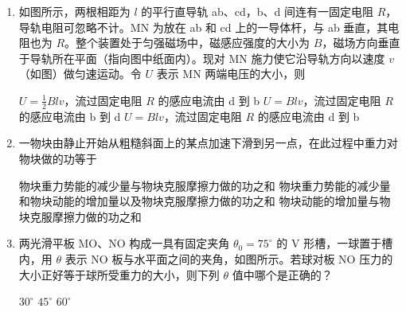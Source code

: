 \documentclass[\gkver]{gaokaozhenti}
\begin{document}
\begin{enumerate}

\item
如图所示，两根相距为 $l$ 的平行直导轨 ab、cd，b、d 间连有一固定电阻 $R$，导轨电阻可忽略不计。MN 为放在 ab 和 cd 上的一导体杆，与 ab 垂直，其电阻也为 $R$。整个装置处于匀强磁场中，磁感应强度的大小为 $B$，磁场方向垂直于导轨所在平面（指向图中纸面内）。现对 MN 施力使它沿导轨方向以速度 $v$（如图）做匀速运动。令 $U$ 表示 MN 两端电压的大小，则


{$U=\frac{1}{2}Blv$，流过固定电阻 $R$ 的感应电流由 d 到 b}
{$U=Blv$，流过固定电阻 $R$ 的感应电流由 b 到 d}
{$U=Blv$，流过固定电阻 $R$ 的感应电流由 d 到 b}


\item
一物块由静止开始从粗糙斜面上的某点加速下滑到另一点，在此过程中重力对物块做的功等于

{物块重力势能的减少量与物块克服摩擦力做的功之和}
{物块重力势能的减少量和物块动能的增加量以及物块克服摩擦力做的功之和}
{物块动能的增加量与物块克服摩擦力做的功之和}


\item
两光滑平板 MO、NO 构成一具有固定夹角 $\theta_{0}=75^{\circ}$ 的 V 形槽，一球置于槽内，用 $\theta$ 表示 NO 板与水平面之间的夹角，如图所示。若球对板 NO 压力的大小正好等于球所受重力的大小，则下列 $\theta$ 值中哪个是正确的？


{$30^{\circ}$}
{$45^{\circ}$}
{$60^{\circ}$}


\end{enumerate}
\end{document}
